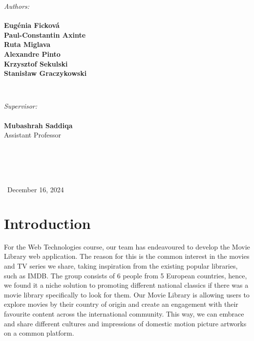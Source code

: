 \documentclass[letterpaper,twocolumn]{article}
\begin{document}
\begin{titlepage}
\begin{minipage}{0.4\textwidth}
\begin{flushleft} \large
\emph{Authors:}
\\\textbf{}
\\\textbf{Eugénia Ficková}
\\\textbf{Paul-Constantin Axinte}
\\\textbf{Ruta Miglava}
\\\textbf{Alexandre Pinto}
\\\textbf{Krzysztof Sekulski}
\\\textbf{Stanisław Graczykowski}


\end{flushleft}
\end{minipage}
~
\begin{minipage}{0.4\textwidth}
\begin{flushright} \large
\emph{Supervisor:} 
\\\textbf{}
\\\textbf{Mubashrah Saddiqa}
\\Assistant Professor
\\\textbf{}
\\\textbf{}
\\\textbf{}
\\\textbf{}


\end{flushright}
\end{minipage}\\[3cm]




\centering
\large \ December 16, 2024


\vfill %

\end{titlepage}




\section{Introduction}

For the Web Technologies course, our team has endeavoured to develop the Movie Library web application. The reason for this is the common interest in the movies and TV series we share, taking inspiration from the existing popular libraries, such as IMDB. The group consists of 6 people from 5 European countries, hence, we found it a niche solution to promoting different national classics if there was a movie library specifically to look for them. Our Movie Library is allowing users to explore movies by their country of origin and create an engagement with their favourite content across the international community. This way, we can embrace and share different cultures and impressions of domestic motion picture artworks on a common platform. \\
\end{document}
